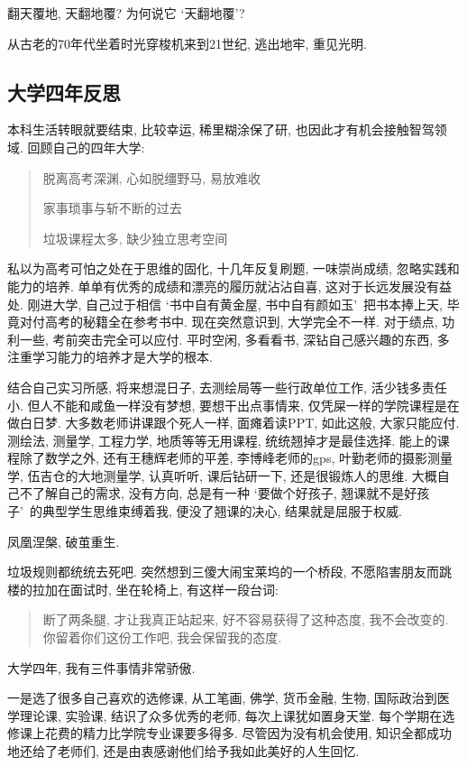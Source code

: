 \documentclass[a4paper, UTF8,  12pt]{article}
\begin{document}
翻天覆地, 天翻地覆? 为何说它 \lq 天翻地覆\rq ? 

从古老的70年代坐着时光穿梭机来到21世纪, 逃出地牢, 重见光明. 

\subsection{大学四年反思}

本科生活转眼就要结束, 比较幸运, 稀里糊涂保了研, 也因此才有机会接触智驾领域. 回顾自己的四年大学: 
\begin{quotation}
	脱离高考深渊, 心如脱缰野马, 易放难收

	家事琐事与斩不断的过去

	垃圾课程太多, 缺少独立思考空间

\end{quotation}

私以为高考可怕之处在于思维的固化, 十几年反复刷题, 一味崇尚成绩, 忽略实践和能力的培养. 单单有优秀的成绩和漂亮的履历就沾沾自喜, 这对于长远发展没有益处. 刚进大学, 自己过于相信 \lq 书中自有黄金屋, 书中自有颜如玉\rq\ 把书本捧上天, 毕竟对付高考的秘籍全在参考书中. 现在突然意识到, 大学完全不一样. 对于绩点, 功利一些, 考前突击完全可以应付. 平时空闲, 多看看书, 深钻自己感兴趣的东西, 多注重学习能力的培养才是大学的根本.

结合自己实习所感, 将来想混日子, 去测绘局等一些行政单位工作, 活少钱多责任小. 但人不能和咸鱼一样没有梦想, 要想干出点事情来, 仅凭屎一样的学院课程是在做白日梦. 大多数老师讲课跟个死人一样, 面瘫着读PPT, 如此这般, 大家只能应付. 测绘法, 测量学, 工程力学, 地质等等无用课程, 统统翘掉才是最佳选择. 能上的课程除了数学之外, 还有王穗辉老师的平差, 李博峰老师的gps, 叶勤老师的摄影测量学, 伍吉仓的大地测量学, 认真听听, 课后钻研一下, 还是很锻炼人的思维. 大概自己不了解自己的需求, 没有方向, 总是有一种 \lq 要做个好孩子, 翘课就不是好孩子\rq\ 的典型学生思维束缚着我, 便没了翘课的决心, 结果就是屈服于权威. 

凤凰涅槃, 破茧重生.

垃圾规则都统统去死吧. 突然想到三傻大闹宝莱坞的一个桥段, 不愿陷害朋友而跳楼的拉加在面试时, 坐在轮椅上, 有这样一段台词:
\begin{quotation}
    断了两条腿, 才让我真正站起来, 好不容易获得了这种态度, 我不会改变的. 你留着你们这份工作吧, 我会保留我的态度.        
\end{quotation}

大学四年, 我有三件事情非常骄傲. 

一是选了很多自己喜欢的选修课, 从工笔画, 佛学, 货币金融, 生物, 国际政治到医学理论课, 实验课, 结识了众多优秀的老师, 每次上课犹如置身天堂. 每个学期在选修课上花费的精力比学院专业课要多得多. 尽管因为没有机会使用, 知识全都成功地还给了老师们, 还是由衷感谢他们给予我如此美好的人生回忆. 
\end{document}
